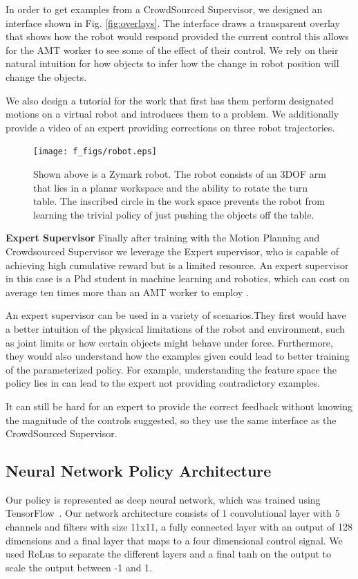 \documentclass[10pt, conference]{ieeeconf}      %
\begin{document}
In order to get examples from a CrowdSourced Supervisor, we designed an interface shown in Fig. \ref{fig:overlays}. The interface draws a transparent overlay that shows how the robot would respond provided the current control this allows for the AMT worker to see some of the effect of their control. We rely on their natural intuition for how objects to infer how the change in robot position will change the objects.

We also design a tutorial for the work that first has them perform designated motions on a virtual robot and introduces them to a problem. We additionally provide a video of an expert providing corrections on three robot trajectories. 

\begin{figure}[t!]
\centering
\texttt{[image: f\_figs/robot.eps]}
\caption{ \footnotesize Shown above is a Zymark robot. The robot consists of an 3DOF arm that lies in a planar workspace and the ability to rotate the turn table. The inscribed circle in the work space prevents the robot from learning the trivial policy of just pushing the objects off the table.}
\vspace*{-10pt}
\label{fig:robot}
\end{figure}


\noindent \textbf{Expert Supervisor} Finally after training with the Motion Planning and Crowdsourced Supervisor we leverage the Expert supervisor, who is capable of achieving high cumulative reward but is a limited resource. An expert supervisor in this case is a Phd student in machine learning and robotics, which can cost on average ten times more than an AMT worker to employ \cite{}.

An expert supervisor can be used in a variety of scenarios.They first would have a better intuition of the physical limitations of the robot and environment, such as joint limits or how certain objects might behave under force. Furthermore, they would also understand how the examples given could lead to better training of the parameterized policy. For example, understanding the feature space the policy lies in can lead to the expert not providing contradictory examples. 

It can still be hard for an expert to provide the correct feedback without knowing the magnitude of the controls suggested, so they use the same interface as the CrowdSourced Supervisor. 

\subsection{ Neural Network Policy Architecture}
Our policy is represented as deep neural network, which was trained using TensorFlow~\cite{tensorflow2015-whitepaper}. Our network architecture consists of 1 convolutional layer with 5 channels and filters with size 11x11, a fully connected layer with an output of 128 dimensions and a final layer that maps to a four dimensional control signal. We used ReLus to separate the different layers and a final tanh on the output to scale the output between -1 and 1. 
\end{document}
